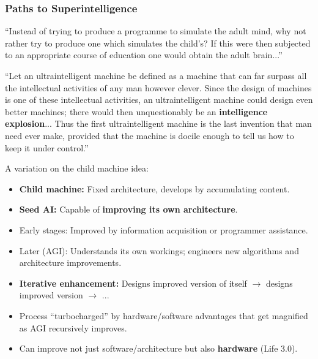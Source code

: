\subsubsection{Paths to Superintelligence}

\begin{keybox}
``Instead of trying to produce a programme to simulate the adult mind, why not rather try to produce one which simulates the child's? If this were then subjected to an appropriate course of education one would obtain the adult brain...''
\end{keybox}

\begin{keybox}
``Let an ultraintelligent machine be defined as a machine that can far surpass all the intellectual activities of any man however clever. Since the design of machines is one of these intellectual activities, an ultraintelligent machine could design even better machines; there would then unquestionably be an \textbf{intelligence explosion}... Thus the first ultraintelligent machine is the last invention that man need ever make, provided that the machine is docile enough to tell us how to keep it under control.''
\end{keybox}

\begin{defbox}[Seed AI]
A variation on the child machine idea:
\begin{itemize}
  \item \textbf{Child machine:} Fixed architecture, develops by accumulating content.
  \item \textbf{Seed AI:} Capable of \textbf{improving its own architecture}.
  \item Early stages: Improved by information acquisition or programmer assistance.
  \item Later (AGI): Understands its own workings; engineers new algorithms and architecture improvements.
  \item \textbf{Iterative enhancement:} Designs improved version of itself $\to$ designs improved version $\to$ ...
  \item Process ``turbocharged'' by hardware/software advantages that get magnified as AGI recursively improves.
  \item Can improve not just software/architecture but also \textbf{hardware} (Life 3.0).
\end{itemize}
\end{defbox}

